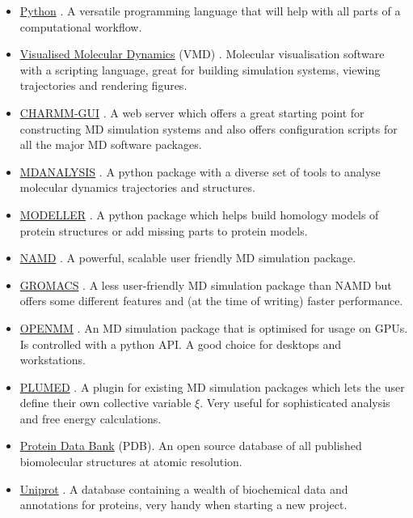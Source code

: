 \begin{itemize}
	\item \href{https://www.python.org/about/gettingstarted/}{Python} \cite{van1995python}. A versatile programming language that will help with all parts of a computational workflow.
	\item \href{https://www.ks.uiuc.edu/Research/vmd/}{Visualised Molecular Dynamics} (VMD) \cite{humphrey1996}. Molecular visualisation software with a scripting language, great for building simulation systems, viewing trajectories and rendering figures. 
	\item \href{https://charmm-gui.org}{CHARMM-GUI} \cite{mallajosyula2015}. A web server which offers a great starting point for constructing MD simulation systems and also offers configuration scripts for all the major MD software packages.
	\item \href{https://www.mdanalysis.org/}{MDANALYSIS} \cite{michaud-agrawal2011}\cite{gowers2016}. A python package with a diverse set of tools to analyse molecular dynamics trajectories and structures. 
	\item \href{https://salilab.org/modeller/}{MODELLER} \cite{sali1993}\cite{shen2006}\cite{webb2016}. A python package which helps build homology models of protein structures or add missing parts to protein models.
	\item \href{https://www.ks.uiuc.edu/Research/namd/}{NAMD} \cite{phillips2005}. A powerful, scalable user friendly MD simulation package.
	\item \href{https://manual.gromacs.org/current/index.html}{GROMACS} \cite{abraham2015}. A less user-friendly MD simulation package than NAMD but offers some different features and (at the time of writing) faster performance.
	\item \href{https://openmm.org/}{OPENMM} \cite{eastman2017}. An MD simulation package that is optimised for usage on GPUs. Is controlled with a python API. A good choice for desktops and workstations.
	\item \href{https://www.plumed.org/}{PLUMED} \cite{tribello2014}. A plugin for existing MD simulation packages which lets the user define their own collective variable $\xi$. Very useful for sophisticated analysis and free energy calculations. 
	\item \href{https://www.rcsb.org/}{Protein Data Bank} (PDB). An open source database of all published biomolecular structures at atomic resolution. 
	\item \href{https://www.uniprot.org/}{Uniprot} \cite{theuniprotconsortium2021}. A database containing a wealth of biochemical data and annotations for proteins, very handy when starting a new project.

\end{itemize}
